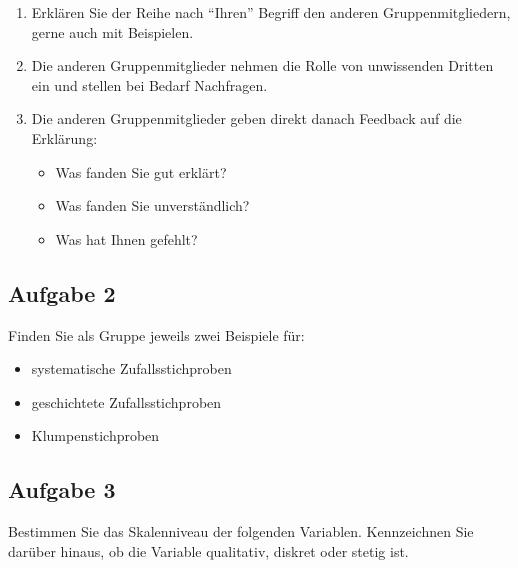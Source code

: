 \documentclass[
  11pt,
  ngerman,
  a4paper,
]{report}
\providecommand{\tightlist}{%
  \setlength{\itemsep}{0pt}\setlength{\parskip}{0pt}}
\begin{document}
\begin{enumerate}
\def\labelenumi{\arabic{enumi}.}
\tightlist
\item
  Erklären Sie der Reihe nach \enquote{Ihren} Begriff den anderen Gruppenmitgliedern, gerne auch mit Beispielen.
\item
  Die anderen Gruppenmitglieder nehmen die Rolle von unwissenden Dritten ein und stellen bei Bedarf Nachfragen.
\item
  Die anderen Gruppenmitglieder geben direkt danach Feedback auf die Erklärung:

  \begin{itemize}
  \tightlist
  \item
    Was fanden Sie gut erklärt?
  \item
    Was fanden Sie unverständlich?
  \item
    Was hat Ihnen gefehlt?
  \end{itemize}
\end{enumerate}

\hypertarget{aufgabe-2}{%
\subsection{Aufgabe 2}\label{aufgabe-2}}

Finden Sie als Gruppe jeweils zwei Beispiele für:

\begin{itemize}
\tightlist
\item
  systematische Zufallsstichproben
\item
  geschichtete Zufallsstichproben
\item
  Klumpenstichproben
\end{itemize}

\hypertarget{aufgabe-3}{%
\subsection{Aufgabe 3}\label{aufgabe-3}}

Bestimmen Sie das Skalenniveau der folgenden Variablen. Kennzeichnen Sie darüber hinaus, ob die Variable qualitativ, diskret oder stetig ist.
\end{document}
